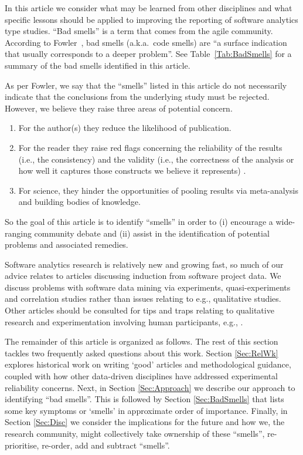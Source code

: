 \documentclass[preprint,10pt]{elsarticle}
\newcommand{\RED}{\color{red}}
\newcommand{\BLACK}{\color{black}}
\begin{document}
In this article we consider what may be learned from other disciplines and what specific lessons should be applied to improving the reporting of software analytics type studies.  ``Bad smells'' is a term that comes from the agile community. According to Fowler~\cite{beck1999bad}, bad smells (a.k.a.\ code smells) are ``a surface indication that usually corresponds to a deeper problem''.  See Table~\ref{Tab:BadSmells} for a summary of the bad smells identified in this article.

As per Fowler, we say that the ``smells''  listed in this article do not necessarily indicate that the conclusions from the underlying study must be rejected.  However, we believe they raise three areas of potential concern.
\begin{enumerate}
    \item For the author(s) they reduce the likelihood of publication.
    \item For the reader they raise red flags concerning the reliability of the results \RED (i.e., the consistency) and the validity (i.e., the correctness of the analysis or how well it captures those constructs we believe it represents) \BLACK.
    \item For science, they hinder the opportunities of pooling results via meta-analysis and building bodies of knowledge. 
\end{enumerate}
So the goal of this article is to identify ``smells'' in order to (i) encourage a wide-ranging community debate and (ii) assist in the identification of potential problems and associated remedies.  

Software analytics research is relatively new and growing fast, so much of our advice relates to articles discussing induction from software project data. We discuss problems with software data mining via experiments, quasi-experiments and correlation studies \cite{Shad02} rather than issues relating to e.g., qualitative studies.  Other articles should be consulted for tips and traps relating to qualitative research and experimentation involving human participants, e.g., \cite{stol2016grounded,cruzes2011research,ko2015practical,petersen2015guidelines}.

The remainder of this article is organized as follows. The rest of this section tackles two frequently asked questions about this work. Section \ref{Sec:RelWk} explores historical work on writing `good' articles and methodological guidance, coupled with how other data-driven disciplines have addressed experimental reliability concerns.  Next, in Section \ref{Sec:Approach} we describe our approach to identifying ``bad smells''.  This is followed by Section \ref{Sec:BadSmells} that lists some key symptoms or `smells' in approximate order of importance.  Finally, in Section \ref{Sec:Disc} we consider the implications for the future and how we, the research community, might collectively take ownership of these ``smells'', re-prioritise, re-order, add and subtract ``smells''.
\end{document}
